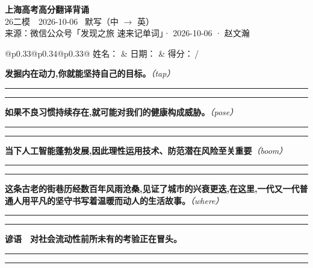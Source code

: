 \documentclass[11pt,a4paper]{article}
\newcommand{\num}[1]{\makebox[1.9em][r]{#1.}\hspace{0.3em}}
\newcommand{\wline}{\noindent\rule{\linewidth}{0.4pt}}
\newcommand{\prompt}[1]{\emph{\textcolor{tipblue}{\small（#1）}}}
\begin{document}
\pagestyle{plain}
\begin{center}
{\LARGE\bfseries 上海高考高分翻译背诵 }\\[0.25em]
{\large 26二模　2026-10-06 \quad\ 默写（中 $\to$ 英）}\\[0.35em]
{\footnotesize 来源：微信公众号「发现之旅 速来记单词」· 2026-10-06 · 赵文瀚}
\end{center}

\vspace{0.4em}
\noindent\begin{tabular}{@{}p{0.33\textwidth}@{}p{0.34\textwidth}@{}p{0.33\textwidth}@{}}
姓名：\underline{\hspace{2.0cm}} & 日期：\underline{\hspace{2.0cm}} & 得分：\underline{\hspace{1.4cm}}\,/ \\
\end{tabular}

\vspace{0.5em}

\vspace{0.8em}
\num{1}\textbf{发掘内在动力,你就能坚持自己的目标。}\prompt{tap}

\vspace{0.3em}

\wline\vspace{0.3em}
\wline

\num{2}\textbf{如果不良习惯持续存在,就可能对我们的健康构成威胁。}\prompt{pose}

\vspace{0.3em}

\wline\vspace{0.3em}
\wline

\num{3}\textbf{当下人工智能蓬勃发展,因此理性运用技术、防范潜在风险至关重要}\prompt{boom}

\vspace{0.3em}

\wline\vspace{0.3em}
\wline

\num{4}\textbf{这条古老的街巷历经数百年风雨沧桑,见证了城市的兴衰更迭,在这里,一代又一代普通人用平凡的坚守书写着温暖而动人的生活故事。}\prompt{where}

\vspace{0.3em}

\wline\vspace{0.3em}
\wline

\vspace{0.4em}\noindent{\color{rulegray}\rule{\textwidth}{0.6pt}}\vspace{0.4em}

\num{5}\textbf{谚语　对社会流动性前所未有的考验正在冒头。}

\vspace{0.3em}

\wline\vspace{0.3em}
\wline
\end{document}
